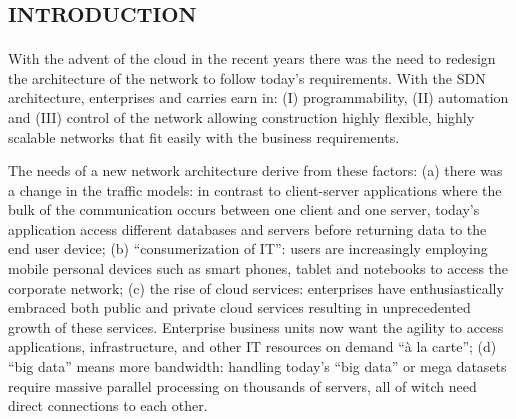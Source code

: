 %
\section*{\small \textsc{introduction}}
With the advent of the cloud in the recent years there was the need to redesign the architecture of the network to follow today's requirements. With the \ac{SDN} architecture, enterprises and carries earn in: (I) programmability, (II) automation and (III) control of the network allowing construction  highly flexible, highly scalable networks that fit easily with the business requirements.

The needs of a new network architecture derive from these factors: (a) there was a change in the traffic models: in contrast to client-server applications where the bulk of the communication occurs between one client and one server, today's application access different databases and servers before returning data to the end user device; (b) ``consumerization of \ac{IT}'': users are increasingly employing mobile personal devices such as smart phones, tablet and notebooks to access the corporate network; (c) the rise of cloud services: enterprises have enthusiastically embraced both public and private cloud services resulting in unprecedented growth of these services. Enterprise business units now want the agility to access applications, infrastructure, and other \ac{IT} resources on demand ``à la carte''; (d) ``big data'' means more bandwidth: handling today's ``big data'' or mega datasets require massive parallel processing on thousands of servers, all of witch need direct connections to each other.

